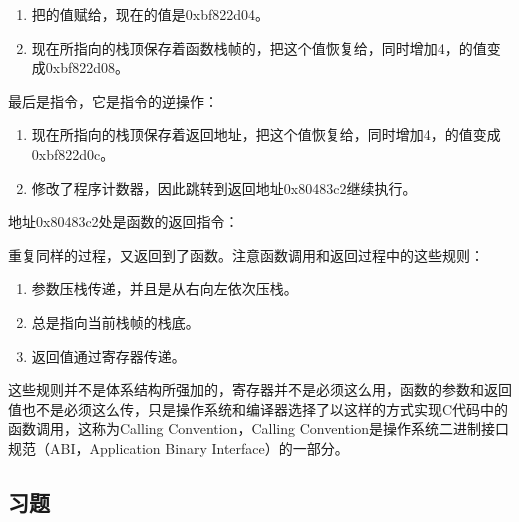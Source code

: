 \begin{enumerate}

\item 把的值赋给，现在的值是0xbf822d04。

\item 现在所指向的栈顶保存着函数栈帧的，把这个值恢复给，同时增加4，的值变成0xbf822d08。
\end{enumerate}


最后是指令，它是指令的逆操作：


\begin{enumerate}

\item 现在所指向的栈顶保存着返回地址，把这个值恢复给，同时增加4，的值变成0xbf822d0c。

\item 修改了程序计数器，因此跳转到返回地址0x80483c2继续执行。
\end{enumerate}


地址0x80483c2处是函数的返回指令：




重复同样的过程，又返回到了函数。注意函数调用和返回过程中的这些规则：


\begin{enumerate}

\item 参数压栈传递，并且是从右向左依次压栈。

\item {}总是指向当前栈帧的栈底。

\item 返回值通过寄存器传递。
\end{enumerate}


这些规则并不是体系结构所强加的，寄存器并不是必须这么用，函数的参数和返回值也不是必须这么传，只是操作系统和编译器选择了以这样的方式实现C代码中的函数调用，这称为Calling Convention，Calling Convention是操作系统二进制接口规范（ABI，Application Binary Interface）的一部分。


\subsection*{习题}
%


